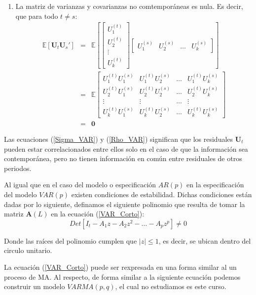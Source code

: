 \documentclass[
  a4paper,
]{article}
\begin{document}
\begin{enumerate}
    \item La matriz de varianzas y covarianzas no comtemporáneas es nula. Es decir, que para todo $t \neq s$:
    \begin{eqnarray}
        \mathbb{E} [\mathbf{U}_t \mathbf{U}_s'] 
        & = &
        \mathbb{E} \left[
        \begin{bmatrix}
        U^{(t)}_{1} \\ U^{(t)}_{2} \\ \vdots \\ U^{(t)}_{k}
        \end{bmatrix}
        \begin{bmatrix}
        U^{(s)}_{1} & U^{(s)}_{2} & \ldots & U^{(s)}_{k}
        \end{bmatrix}
        \right] \nonumber \\
        & =  & \mathbb{E}
        \begin{bmatrix}
        U^{(t)}_{1} U^{(s)}_{1} & U^{(t)}_{1} U^{(s)}_{2} & \ldots & U^{(t)}_{1} U^{(s)}_{k} \\
        U^{(t)}_{2} U^{(s)}_{1} & U^{(t)}_{2} U^{(s)}_{2} & \ldots & U^{(t)}_{2} U^{(s)}_{k} \\
        \vdots & \vdots & \ldots & \vdots \\
        U^{(t)}_{k} U^{(s)}_{1} & U^{(t)}_{k} U^{(s)}_{2} & \ldots & U^{(t)}_{k} U^{(s)}_{k}
        \end{bmatrix} \nonumber \\
        & = & \mathbf{0}
        \label{Rho_VAR}
    \end{eqnarray}
\end{enumerate}

Las ecuaciones (\ref{Sigma_VAR}) y (\ref{Rho_VAR}) significan que los
residuales \(\mathbf{U}_t\) pueden estar correlacionados entre ellos
solo en el caso de que la información sea contemporánea, pero no tienen
información en común entre residuales de otros periodos.

Al igual que en el caso del modelo o especificación \(AR(p)\) en la
especificación del modelo \(VAR(p)\) existen condiciones de estabilidad.
Dichas condiciones están dadas por lo siguiente, definamos el siguiente
polinomio que resulta de tomar la matriz \(\mathbf{A}(L)\) en la
ecuación (\ref{VAR_Corto}): \[
    Det[I_t - A_1 z - A_2 z^2 - \ldots - A_p z^p] \neq 0
\]

Donde las raíces del polinomio cumplen que \(|z| \leq 1\), es decir, se
ubican dentro del circulo unitario.

La ecuación (\ref{VAR_Corto}) puede ser rexpresada en una forma similar
al un proceso de MA. Al respecto, de forma similar a la siguiente
ecuación podemos construir un modelo \(VARMA(p,q)\), el cual no
estudiamos es este curso.
\end{document}
